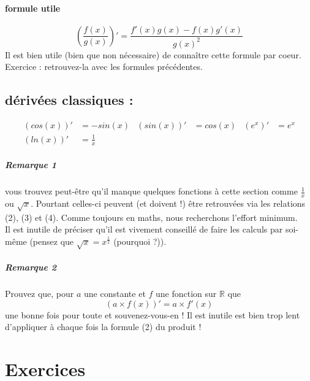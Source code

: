 \documentclass[11pt]{article}
\newcommand{\R}{\mathbb R}
\newcommand{\de}[1]{(#1)'}
\begin{document}
        \paragraph{formule utile}
        \begin{equation*}
            (\frac{f(x)}{g(x)})' = \frac{f'(x)g(x) - f(x)g'(x)}{g(x)^2}
        \end{equation*}
        Il est bien utile (bien que non nécessaire) de connaître cette formule par coeur.\\
        Exercice : retrouvez-la avec les formules précédentes.
        \subsection{dérivées classiques :}
        \begin{align*}
            \de{cos(x)} &= -sin(x) &\de{sin(x)} &= cos(x) & \de{e^x} &= e^x \\
            \de{ln(x)} &= \frac{1}{x} 
        \end{align*}
        \subparagraph{Remarque 1} vous trouvez peut-être qu'il manque quelques fonctions à cette section comme $\frac{1}{x}$ ou $\sqrt{x}$. Pourtant celles-ci peuvent (et doivent !) être retrouvées via les relations (2), (3) et (4). Comme toujours en maths, nous recherchons l'effort minimum.\\
        Il est inutile de préciser qu'il est vivement conseillé de faire les calculs par soi-même (pensez que $\sqrt{x} = x^{\frac{1}{2}}$ (pourquoi ?)).
        \subparagraph{Remarque 2} Prouvez que, pour $a$ une constante et $f$ une fonction sur $\R$ que
        \begin{equation*}
         \de{a\times f(x)} = a\times f'(x) 
        \end{equation*}
         une bonne fois pour toute et souvenez-vous-en ! Il est inutile est bien trop lent d'appliquer à chaque fois la formule (2) du produit !  

    \section{Exercices}
\end{document}
